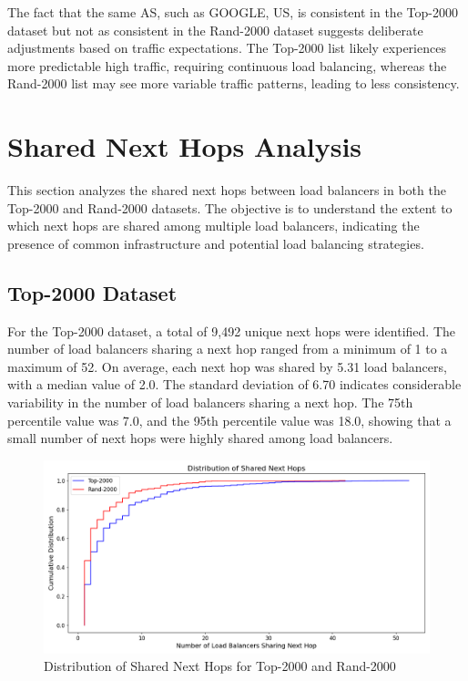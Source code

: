 \documentclass[12pt]{cwru_thesis}
\begin{document}
The fact that the same AS, such as GOOGLE, US, is consistent in the Top-2000 dataset but not as consistent in the Rand-2000 dataset suggests deliberate adjustments based on traffic expectations. The Top-2000 list likely experiences more predictable high traffic, requiring continuous load balancing, whereas the Rand-2000 list may see more variable traffic patterns, leading to less consistency.

\newpage



\section{Shared Next Hops Analysis}

This section analyzes the shared next hops between load balancers in both the Top-2000 and Rand-2000 datasets. The objective is to understand the extent to which next hops are shared among multiple load balancers, indicating the presence of common infrastructure and potential load balancing strategies.

\subsection{Top-2000 Dataset}

For the Top-2000 dataset, a total of 9,492 unique next hops were identified. The number of load balancers sharing a next hop ranged from a minimum of 1 to a maximum of 52. On average, each next hop was shared by 5.31 load balancers, with a median value of 2.0. The standard deviation of 6.70 indicates considerable variability in the number of load balancers sharing a next hop. The 75th percentile value was 7.0, and the 95th percentile value was 18.0, showing that a small number of next hops were highly shared among load balancers.

\begin{figure}[h!]
    \centering
    \includegraphics[width=\linewidth]{figures/shared_next_hops_combined.png}
    \caption{Distribution of Shared Next Hops for Top-2000 and Rand-2000}
    \label{fig:shared_next_hops_combined}
\end{figure}
\end{document}
